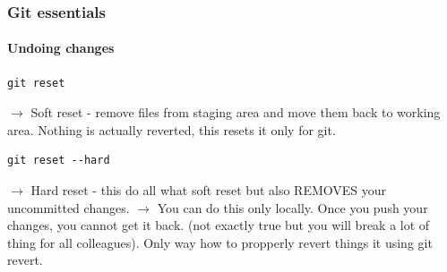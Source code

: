\documentclass[aspectratio=169]{beamer}
\newcommand{\adjustimg}{%
  \checkoddpage%
  \ifoddpage\hspace*{\dimexpr\evensidemargin-\oddsidemargin}\else\hspace*{-\dimexpr\evensidemargin-\oddsidemargin}\fi%
}
\newcommand{\centerimg}[2][width=\textwidth]{%
  \makebox[\textwidth]{\adjustimg\texttt{[image: \#2]}}%
}
\begin{document}
    \begin{frame}[fragile]
        \frametitle{Git essentials}
        \framesubtitle{Undoing changes}
        \begin{lstlisting}[gobble=12]
            git reset
        \end{lstlisting}
        $\rightarrow$ Soft reset - remove files from staging area and move them back to working area. Nothing is actually reverted, this resets it only for git.
        \begin{lstlisting}[gobble=12]
            git reset --hard
        \end{lstlisting}
        $\rightarrow$ Hard reset - this do all what soft reset but also REMOVES your uncommitted changes.
        \newline\newline
        $\rightarrow$ You can do this only locally. Once you push your changes, you cannot get it back. (not exactly true but you will break a lot of thing for all colleagues). Only way how to propperly revert things it using git revert.
    \end{frame}

    \begin{frame}
        \noindent\centerimg[height=1.0\textheight]{it-hell.png}
    \end{frame}
\end{document}
